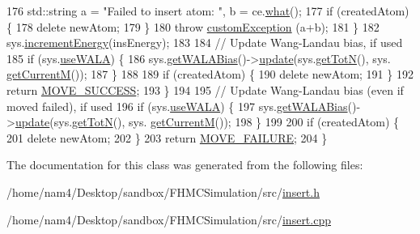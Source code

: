 \begin{DoxyCode}
176             std::string a = \textcolor{stringliteral}{"Failed to insert atom: "}, b = ce.\hyperlink{classcustom_exception_aeb6ab5848b038adfc68fde86a512f691}{what}();
177             \textcolor{keywordflow}{if} (createdAtom) \{
178                 \textcolor{keyword}{delete} newAtom;
179             \}
180             \textcolor{keywordflow}{throw} \hyperlink{classcustom_exception}{customException} (a+b);
181         \}
182         sys.\hyperlink{classsim_system_a6ad31c08955b80873f865b3069618dcb}{incrementEnergy}(insEnergy);
183 
184         \textcolor{comment}{// Update Wang-Landau bias, if used}
185         \textcolor{keywordflow}{if} (sys.\hyperlink{classsim_system_aa83b00006b3919fb6e13f1bdeadece6a}{useWALA}) \{
186             sys.\hyperlink{classsim_system_a7cb5049de8b0988349e89e30e4000407}{getWALABias}()->\hyperlink{classwala_ab439e3f60bea6c54522a870b9ad67acf}{update}(sys.\hyperlink{classsim_system_a37dd827f4057049763351510147b9f1d}{getTotN}(), sys.
      \hyperlink{classsim_system_a299fe4372e610b554eaaf5f5957b2dbc}{getCurrentM}());
187         \}
188 
189         \textcolor{keywordflow}{if} (createdAtom) \{
190             \textcolor{keyword}{delete} newAtom;
191         \}
192         \textcolor{keywordflow}{return} \hyperlink{moves_8h_ae8285cbddc5d21f73f49dcbad82a775a}{MOVE\_SUCCESS};
193     \}
194 
195     \textcolor{comment}{// Update Wang-Landau bias (even if moved failed), if used}
196     \textcolor{keywordflow}{if} (sys.\hyperlink{classsim_system_aa83b00006b3919fb6e13f1bdeadece6a}{useWALA}) \{
197         sys.\hyperlink{classsim_system_a7cb5049de8b0988349e89e30e4000407}{getWALABias}()->\hyperlink{classwala_ab439e3f60bea6c54522a870b9ad67acf}{update}(sys.\hyperlink{classsim_system_a37dd827f4057049763351510147b9f1d}{getTotN}(), sys.
      \hyperlink{classsim_system_a299fe4372e610b554eaaf5f5957b2dbc}{getCurrentM}());
198     \}
199 
200     \textcolor{keywordflow}{if} (createdAtom) \{
201         \textcolor{keyword}{delete} newAtom;
202     \}
203     \textcolor{keywordflow}{return} \hyperlink{moves_8h_a9832cf5fcfa8c0894545b591c9908e39}{MOVE\_FAILURE};
204 \}
\end{DoxyCode}


The documentation for this class was generated from the following files\-:\begin{DoxyCompactItemize}
\item 
/home/nam4/\-Desktop/sandbox/\-F\-H\-M\-C\-Simulation/src/\hyperlink{insert_8h}{insert.\-h}\item 
/home/nam4/\-Desktop/sandbox/\-F\-H\-M\-C\-Simulation/src/\hyperlink{insert_8cpp}{insert.\-cpp}\end{DoxyCompactItemize}
